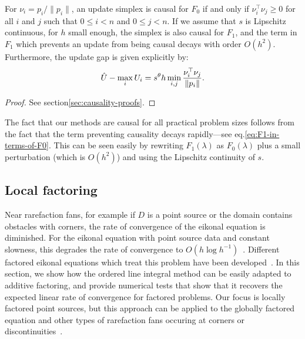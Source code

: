 \documentclass[smallcondensed]{svjour3}
\begin{document}
\begin{theorem}\label{thm:causality}
  For $\nu_i = p_i/\|p_i\|$, an update simplex is causal for $F_0$ if
  and only if $\nu_i^\top \nu_j \geq 0$ for all $i$ and $j$ such that
  $0 \leq i < n$ and $0 \leq j < n$. If we assume that $s$ is
  Lipschitz continuous, for $h$ small enough, the simplex is also
  causal for $F_1$, and the term in $F_1$ which prevents an update
  from being causal decays with order $O(h^2)$. Furthermore, the
  update gap is given explicitly by:
  \begin{equation}
    \hat{U} - \max_i U_i = s^\theta h \min_{i, j} \frac{\nu_i^\top \nu_j}{\left\|p_i\right\|}.
  \end{equation}
\end{theorem}

\begin{proof}
  See section\@ \ref{sec:causality-proofs}.
\end{proof}

\noindent The fact that our methods are causal for all practical
problem sizes follows from the fact that the term preventing causality
decays rapidly---see eq.\@ \ref{eq:F1-in-terms-of-F0}. This can be
seen easily by rewriting $F_1(\lambda)$ as $F_0(\lambda)$ plus a small
perturbation (which is $O(h^2)$) and using the Lipschitz continuity of
$s$.

\subsection{Local factoring}

Near rarefaction fans, for example if $D$ is a point source or the
domain contains obstacles with corners, the rate of convergence of the
eikonal equation is diminished. For the eikonal equation with point
source data and constant slowness, this degrades the rate of
convergence to $O(h \log
h^{-1})$~\cite{qi2018corner,zhao2005fast}. Different factored eikonal
equations which treat this problem have been
developed~\cite{fomel2009fast,luo2012fast}. In this section, we show
how the ordered line integral method can be easily adapted to additive
factoring, and provide numerical tests that show that it recovers the
expected linear rate of convergence for factored problems. Our focus
is locally factored point sources, but this approach can be applied to
the globally factored equation and other types of rarefaction fans
occuring at corners or discontinuities~\cite{qi2018corner}.
\end{document}
